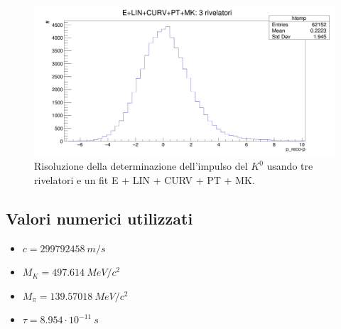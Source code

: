 \documentclass[8pt]{extarticle}
\begin{document}
\begin{figure}
	\begin{center}
		\includegraphics[scale=0.25]{set_1det_p} 
		\caption{Risoluzione della determinazione dell'impulso del $K^0$ usando tre rivelatori e un fit E + LIN + CURV + PT + MK.}
		\label{fig:set_1det_p}
	\end{center}
\end{figure}




\subsection{Valori numerici utilizzati}
\begin{itemize}
\item $c = 299792458\ m/s$
\item $M_K = 497.614\ MeV/c^2$
\item $M_\pi = 139.57018\ MeV/c^2$
\item $\tau = 8.954\cdot 10^{-11}\ s$
\end{itemize}
\end{document}
